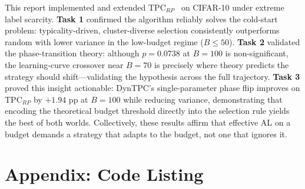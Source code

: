 \documentclass[11pt, twocolumn]{article}
\begin{document}
This report implemented and extended TPC$_{RP}$~\cite{hacohen2022} on CIFAR-10
under extreme label scarcity.
\textbf{Task 1} confirmed the algorithm reliably solves the cold-start problem:
typicality-driven, cluster-diverse selection consistently outperforms random
with lower variance in the low-budget regime ($B{\leq}50$).
\textbf{Task 2} validated the phase-transition theory: although $p{=}0.0738$
at $B{=}100$ is non-significant, the learning-curve crossover near $B{=}70$
is precisely where theory predicts the strategy should shift—validating the
hypothesis across the full trajectory.
\textbf{Task 3} proved this insight actionable: DynTPC's single-parameter
phase flip improves on TPC$_{RP}$ by $+1.94$ pp at $B{=}100$ while reducing
variance, demonstrating that encoding the theoretical budget threshold directly
into the selection rule yields the best of both worlds.
Collectively, these results affirm that effective AL on a budget demands a
strategy that adapts to the budget, not one that ignores it.

\newpage



\newpage

\onecolumn

\section*{Appendix: Code Listing}


\end{document}
